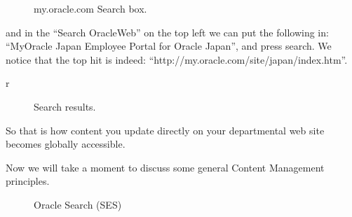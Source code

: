\begin{figure}[h!]
  \centering
  \caption{my.oracle.com Search box.}
\end{figure}

and in the ``Search OracleWeb'' on the top left we can put the
following in: ``MyOracle Japan Employee Portal for Oracle Japan'', and
press search.  We notice that the top hit is indeed:
``http://my.oracle.com/site/japan/index.htm''.

r\begin{figure}[h!]
  \centering
  \caption{Search results.}
\end{figure}

So that is how content you update directly on your departmental web
site becomes globally accessible.

Now we will take a moment to discuss some general Content Management principles.
\begin{figure}[h!]
  \centering
  \caption{Oracle Search (SES)}
\end{figure}


